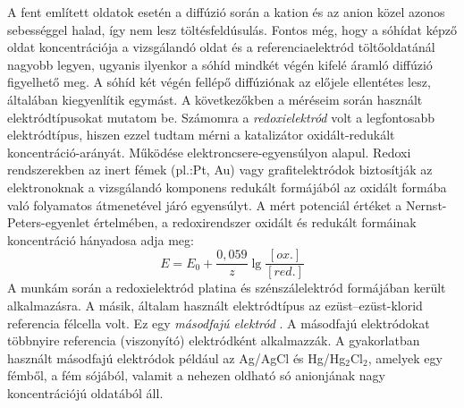 A fent említett oldatok esetén a diffúzió során a kation és az anion közel azonos sebességgel halad, így nem lesz töltésfeldúsulás. Fontos még, hogy a sóhídat képző oldat koncentrációja a vizsgálandó oldat és a referenciaelektród töltőoldatánál nagyobb legyen, ugyanis ilyenkor a sóhíd mindkét végén kifelé áramló diffúzió figyelhető meg. A sóhíd két végén fellépő diffúziónak az előjele ellentétes lesz, általában kiegyenlítik egymást. A következőkben a méréseim során használt elektródtípusokat mutatom be. Számomra a \emph{redoxielektród} volt a legfontosabb elektródtípus, hiszen ezzel tudtam mérni a katalizátor oxidált-redukált koncentráció-arányát. Működése elektroncsere-egyensúlyon alapul. Redoxi rendszerekben az inert fémek (pl.:Pt, Au) vagy grafitelektródok biztosítják az elektronoknak a vizsgálandó komponens redukált formájából az oxidált formába való folyamatos átmenetével járó egyensúlyt. A mért potenciál értéket a Nernst-Peters-egyenlet értelmében, a redoxirendszer oxidált és redukált formáinak koncentráció hányadosa adja meg:
\begin{equation}
E= E_\text{0} + \frac{0,059}{z} \lg \frac{[ox.]}{[red.]}
\end{equation}
A munkám során a redoxielektród platina és szénszálelektród formájában került alkalmazásra.
A másik, általam használt elektródtípus az ezüst--ezüst-klorid referencia félcella volt. Ez egy \emph{másodfajú elektród} \cite{pfreisich1960}. A másodfajú elektródokat többnyire referencia (viszonyító) elektródként alkalmazzák. A gyakorlatban használt másodfajú elektródok például az Ag/AgCl és Hg/Hg$_2$Cl$_2$, amelyek egy fémből, a fém sójából, valamit a nehezen oldható só anionjának nagy koncentrációjú oldatából áll.
    

